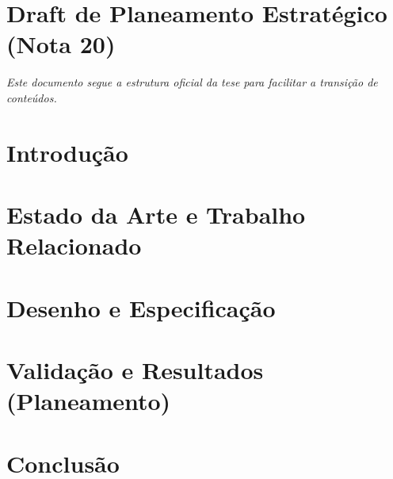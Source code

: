 \documentclass[12pt,a4paper,twoside]{report}
\begin{document}


\chapter*{Draft de Planeamento Estratégico (Nota 20)}
\textit{Este documento segue a estrutura oficial da tese para facilitar a transição de conteúdos.}

\tableofcontents 
\listoffigures 
\listoftables 

\printglossary[type=\acronymtype,title=Acrónimos,nonumberlist]

\chapter{Introdução}


\chapter{Estado da Arte e Trabalho Relacionado}

\cite{*}

\chapter{Desenho e Especificação}




\chapter{Validação e Resultados (Planeamento)}


\chapter{Conclusão}



\end{document}
